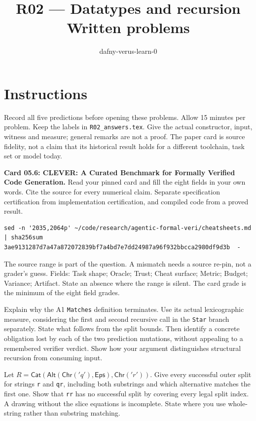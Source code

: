 \documentclass[11pt]{article}
\title{R02 --- Datatypes and recursion \\ \large Written problems}
\author{dafny-verus-learn-0}
\date{}
\begin{document}
\maketitle
\section*{Instructions}
Record all five predictions before opening these problems. Allow 15 minutes
per problem. Keep the labels in \texttt{R02\_answers.tex}. Give the actual
constructor, input, witness and measure; general remarks are not a proof.
The paper card is source fidelity, not a claim that its historical result
holds for a different toolchain, task set or model today.

\begin{problem}\label{prob:B1}
\textbf{Card 05.6: CLEVER: A Curated Benchmark for Formally Verified Code Generation.}
Read your pinned card and fill the eight fields in your own words. Cite the
source for every numerical claim. Separate specification certification from
implementation certification, and compiled code from a proved result.
\begin{verbatim}
sed -n '2035,2064p' ~/code/research/agentic-formal-veri/cheatsheets.md | sha256sum
3ae9131287d7a47a872072839bf7a4bd7e7dd24987a96f932bbcca2980df9d3b  -
\end{verbatim}
The source range is part of the question. A mismatch needs a source re-pin,
not a grader's guess. Fields: Task shape; Oracle; Trust; Cheat surface;
Metric; Budget; Variance; Artifact. State an absence where the range is silent.
The card grade is the minimum of the eight field grades.
\end{problem}

\begin{problem}[proof]\label{prob:B2}
Explain why the A1 \texttt{Matches} definition terminates. Use its actual
lexicographic measure, considering the first and second recursive call in
the \texttt{Star} branch separately. State what follows from the split bounds.
Then identify a concrete obligation lost by each of the two prediction
mutations, without appealing to a remembered verifier verdict. Show how
your argument distinguishes structural recursion from consuming input.
\end{problem}

\begin{problem}[proof]\label{prob:B3}
Let $R=\mathsf{Cat}(\mathsf{Alt}(\mathsf{Chr}('q'),\mathsf{Eps}),
\mathsf{Chr}('r'))$. Give every successful outer split for strings
\texttt{r} and \texttt{qr}, including both substrings and which alternative
matches the first one. Show that \texttt{rr} has no successful split by
covering every legal split index. A drawing without the slice equations is
incomplete. State where you use whole-string rather than substring matching.
\end{problem}
\end{document}

